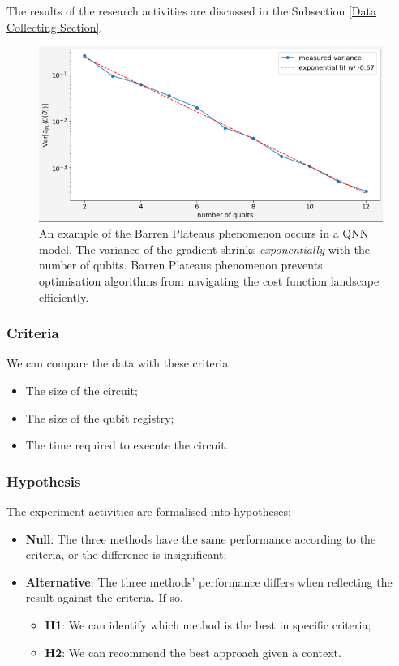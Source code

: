 The results of the research activities are discussed in the Subsection \ref{Data Collecting Section}.

\label{Research Activities section}
\begin{figure}
    \includegraphics[width=\textwidth]{./ResearchDesign/Appendices/VarianceShrinking.png}
    \caption{
        An example of the Barren Plateaus phenomenon occurs in a QNN model.
        The variance of the gradient shrinks \textit{exponentially} with the number of qubits.
        Barren Plateaus phenomenon prevents optimisation algorithms from navigating the cost function landscape efficiently.
    }
    \label{Variance Shrinking demo}
\end{figure}


\subsubsection{Criteria}
\label{Criteria section}
We can compare the data with these criteria:
\begin{itemize}
    \item The size of the circuit;
    \item The size of the qubit registry;
    \item The time required to execute the circuit.
\end{itemize}

\subsubsection{Hypothesis}
The experiment activities are formalised into hypotheses:
\begin{itemize}
    \item \textbf{Null}: The three methods have the same performance according to the criteria, or the difference is insignificant;
    \item \textbf{Alternative}: The three methods' performance differs when reflecting the result against the criteria. If so,
          \begin{itemize}
              \item \textbf{H1}: We can identify which method is the best in specific criteria;
              \item \textbf{H2}: We can recommend the best approach given a context.
          \end{itemize}
\end{itemize}

